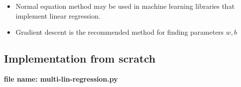 \begin{notebox}
    \begin{itemize}
        \item Normal equation method may  be used in machine learning  libraries that implement linear  regression.
        \item Gradient descent is the  recommended method for  finding parameters \( w,b \)
    \end{itemize}
\end{notebox}

\subsection*{Implementation from scratch} 
\textbf{file name: multi-lin-regression.py}
